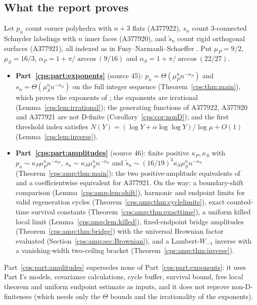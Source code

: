 \documentclass[11pt,letterpaper]{article}
\numberwithin{equation}{section}
\theoremstyle{remark}\newtheorem{remark}[theorem]{Remark}
\begin{document}
\subsection*{What the report proves}
Let $p_n$ count corner polyhedra with $n+3$ flats (A377922), $s_n$ count 3-connected Schnyder
labelings with $n$ inner faces (A377920), and $\widetilde s_n$ count rigid orthogonal surfaces
(A377921), all indexed as in Fusy--Narmanli--Schaeffer \cite{FNS}. Put $\mu_P=9/2$,
$\mu_S=16/3$, $\alpha_P=1+\pi/\arccos(9/16)$ and $\alpha_S=1+\pi/\arccos(22/27)$.
\begin{itemize}
\item \textbf{Part~\ref{cps:part:exponents}} (source 45): $p_n=\Theta(\mu_P^nn^{-\alpha_P})$ and
 $s_n=\Theta(\mu_S^nn^{-\alpha_S})$ on the full integer sequence
 (Theorem~\ref{cps:thm:main}), which proves the exponents of \cite[Conjecture 25]{FNS}; the
 exponents are irrational (Lemma~\ref{cps:lem:irrational}); the generating functions of A377922,
 A377920 and A377921 are not D-finite (Corollary~\ref{cps:cor:nonD}); and the first threshold
 index satisfies $N(Y)=(\log Y+\alpha\log\log Y)/\log\mu+O(1)$ (Lemma~\ref{cps:lem:inverse}).
\item \textbf{Part~\ref{cps:part:amplitudes}} (source 46): finite positive $\kappa_P,\kappa_S$ with
 $p_n\sim\kappa_P\mu_P^nn^{-\alpha_P}$, $s_n\sim\kappa_S\mu_S^nn^{-\alpha_S}$ and
 $\widetilde s_n\sim(16/19)^3\kappa_S\mu_S^nn^{-\alpha_S}$
 (Theorem~\ref{cps:amp:thm:main}): the two positive-amplitude equivalents of
 \cite[Conjecture 25]{FNS} and a coefficientwise equivalent for A377921. On the way: a
 boundary-shift comparison (Lemma~\ref{cps:amp:lem:shift}), harmonic and endpoint limits for
 valid regeneration cycles (Theorem~\ref{cps:amp:thm:cyclelimits}), exact counted-time survival
 constants (Theorem~\ref{cps:amp:thm:exacttime}), a uniform killed local limit
 (Lemma~\ref{cps:amp:lem:killed}), fixed-endpoint bridge amplitudes
 (Theorem~\ref{cps:amp:thm:bridge}) with the universal Brownian factor evaluated
 (Section~\ref{cps:amp:sec:Brownian}), and a Lambert-$W_{-1}$ inverse with a vanishing-width
 two-ceiling bracket (Theorem~\ref{cps:amp:thm:inverse}).
\end{itemize}
Part~\ref{cps:part:amplitudes} supersedes none of Part~\ref{cps:part:exponents}: it uses Part I's
models, covariance calculations, cycle buffer, survival bound, free local theorem and uniform
endpoint estimate as inputs, and it does not reprove non-D-finiteness (which needs only the
$\Theta$ bounds and the irrationality of the exponents).
\end{document}
